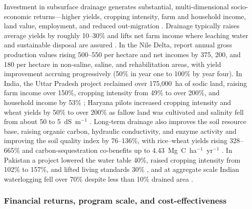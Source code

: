 \documentclass[11pt]{article}
\begin{document}
Investment in subsurface drainage generates substantial, multi-dimensional
socio-economic returns---higher yields, cropping intensity, farm and household
income, land value, employment, and reduced out-migration
\parencite{Gopalakrishnan2007,AbdelDayem2007}. Drainage typically raises average
yields by roughly 10--30\% and lifts net farm income where leaching water and
sustainable disposal are assured \parencite{AbdelDayem2007,Datta2000,Wichelns2002}.
In the Nile Delta, \textcite{Wichelns2002} report annual gross production values
rising 500--550 per hectare and net incomes by 375, 200, and 180 per hectare in
non-saline, saline, and rehabilitation areas, with yield improvement accruing
progressively (50\% in year one to 100\% by year four). In India, the Uttar
Pradesh project reclaimed over 175{,}000~ha of sodic land, raising farm income
over 150\%, cropping intensity from 49\% to over 200\%, and household income by
53\% \parencite{Gopalakrishnan2007}; Haryana pilots increased cropping intensity
and wheat yields by 50\% to over 200\% as fallow land was cultivated and salinity
fell from about 50 to 5~dS~m$^{-1}$ \parencite{Datta2002,Datta2000}. Long-term
drainage also improves the soil resource base, raising organic carbon,
hydraulic conductivity, and enzyme activity and improving the soil quality index
by 76--136\%, with rice--wheat yields rising 328--665\% and carbon-sequestration
co-benefits up to 4.43~Mg~C~ha$^{-1}$~yr$^{-1}$
\parencite{Mukhopadhyay2023,Mukhopadhyay2023b}. In Pakistan a project lowered the
water table 40\%, raised cropping intensity from 102\% to 157\%, and lifted living
standards 30\% \parencite{Ghumman2011}, and at aggregate scale Indian waterlogging
fell over 70\% despite less than 10\% drained area \parencite{Valipour2014}.

\subsubsection{Financial returns, program scale, and cost-effectiveness}
\end{document}
